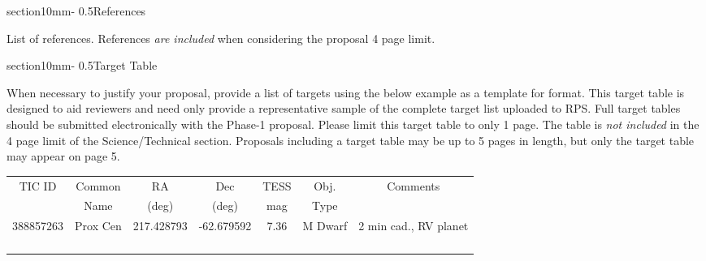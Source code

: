 \documentclass[letterpaper,11pt]{article}
\makeatletter
\renewcommand{\section}{\@startsection%
{section}{1}{0mm}{-\baselineskip}%
{0.5\baselineskip}{\normalfont\Large\bfseries}}%
\makeatother
\begin{document}
\section{References}

List of references. References {\it are included} when considering the proposal 4 page limit.



\section{Target Table}

When necessary to justify your proposal, provide a list of targets using the below example as
a template for format. This target table is designed to aid reviewers and need only provide a
representative sample of the complete target list uploaded to RPS. Full target tables should be
submitted electronically with the Phase-1 proposal. Please limit this target table to only 1 page.
The table is {\it not included} in the 4 page limit of the Science/Technical section. Proposals including
a target table may be up to 5 pages in length, but only the target table may appear on page 5.

\begin{center}
\begin{tabular}{ | c | c | c | c | c | c | c | }
\hline
TIC ID          &      Common      &     RA             &      Dec          &      TESS       &       Obj.        &      Comments \\
                    &      Name           &     (deg)          &      (deg)        &      mag         &       Type       &                         \\
\hline
\hline
388857263  &  Prox Cen          &  217.428793  &  -62.679592  &  7.36             &    M Dwarf    & 2 min cad., RV planet \\ \hline
                    &                           &                       &                      &                      &                     &                                     \\ \hline
                    &                           &                       &                      &                      &                     &                                     \\ \hline
                    &                           &                       &                      &                      &                     &                                     \\ \hline
                    &                           &                       &                      &                      &                     &                                     \\ \hline
\end{tabular}
\end{center}

\end{document}
